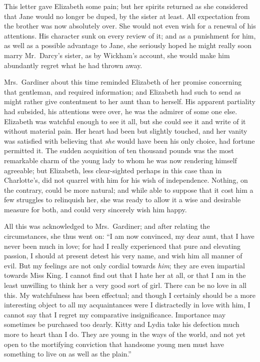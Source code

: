 \documentclass[12pt,english,oneside]{book}
\begin{document}
This letter gave Elizabeth some pain; but her spirits returned as
she considered that Jane would no longer be duped, by the sister at
least. All expectation from the brother was now absolutely over. She
would not even wish for a renewal of his attentions. His character
sunk on every review of it; and as a punishment for him, as well as
a possible advantage to Jane, she seriously hoped he might really
soon marry Mr.\ Darcy's sister, as by Wickham's account, she would
make him abundantly regret what he had thrown away.

Mrs.\ Gardiner about this time reminded Elizabeth of her promise
concerning that gentleman, and required information; and Elizabeth
had such to send as might rather give contentment to her aunt than
to herself. His apparent partiality had subsided, his attentions were
over, he was the admirer of some one else. Elizabeth was watchful
enough to see it all, but she could see it and write of it without
material pain. Her heart had been but slightly touched, and her vanity
was satisfied with believing that \textit{she} would have been his
only choice, had fortune permitted it. The sudden acquisition of ten
thousand pounds was the most remarkable charm of the young lady to
whom he was now rendering himself agreeable; but Elizabeth, less clear-sighted
perhaps in this case than in Charlotte's, did not quarrel with him
for his wish of independence. Nothing, on the contrary, could be more
natural; and while able to suppose that it cost him a few struggles
to relinquish her, she was ready to allow it a wise and desirable
measure for both, and could very sincerely wish him happy.

All this was acknowledged to Mrs.\ Gardiner; and after relating the
circumstances, she thus went on: {}``I am now convinced, my dear
aunt, that I have never been much in love; for had I really experienced
that pure and elevating passion, I should at present detest his very
name, and wish him all manner of evil. But my feelings are not only
cordial towards \textit{him}; they are even impartial towards Miss
King. I cannot find out that I hate her at all, or that I am in the
least unwilling to think her a very good sort of girl. There can be
no love in all this. My watchfulness has been effectual; and though
I certainly should be a more interesting object to all my acquaintances
were I distractedly in love with him, I cannot say that I regret my
comparative insignificance. Importance may sometimes be purchased
too dearly. Kitty and Lydia take his defection much more to heart
than I do. They are young in the ways of the world, and not yet open
to the mortifying conviction that handsome young men must have something
to live on as well as the plain.''
\end{document}
